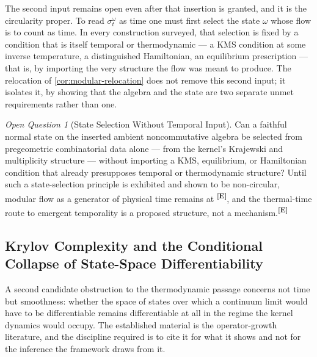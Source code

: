 \documentclass[12pt,a4paper,twoside]{article}
\theoremstyle{plain}
\theoremstyle{definition}
\theoremstyle{remark}
\newtheorem{openquestion}{Open Question}
\newcommand{\catmark}[1]{\textsuperscript{\textsf{\textbf{[#1]}}}}
\begin{document}
The second input remains open even after that insertion is granted, and it
is the circularity proper. To read $\sigma^{\omega}_t$ as time one must
first select the state $\omega$ whose flow is to count as time. In every
construction surveyed, that selection is fixed by a condition that is
itself temporal or thermodynamic --- a KMS condition at some inverse
temperature, a distinguished Hamiltonian, an equilibrium prescription ---
that is, by importing the very structure the flow was meant to produce. The
relocation of \cref{cor:modular-relocation} does not remove this second
input; it isolates it, by showing that the algebra and the state are two
separate unmet requirements rather than one.

\begin{openquestion}[State Selection Without Temporal Input]
\label{oq:state-selection}
Can a faithful normal state on the inserted ambient noncommutative algebra
be selected from pregeometric combinatorial data alone --- from the
kernel's Krajewski and multiplicity structure --- without importing a KMS,
equilibrium, or Hamiltonian condition that already presupposes temporal or
thermodynamic structure? Until such a state-selection principle is
exhibited and shown to be non-circular, modular flow as a generator of
physical time remains at \catmark{E}, and the thermal-time route to
emergent temporality is a proposed structure, not a
mechanism.\catmark{E}
\end{openquestion}

\subsection{Krylov Complexity and the Conditional Collapse of State-Space Differentiability}
\label{subsec:krylov-collapse}

A second candidate obstruction to the thermodynamic passage concerns not
time but smoothness: whether the space of states over which a continuum
limit would have to be differentiable remains differentiable at all in the
regime the kernel dynamics would occupy. The established material is the
operator-growth literature, and the discipline required is to cite it for
what it shows and not for the inference the framework draws from it.
\end{document}
